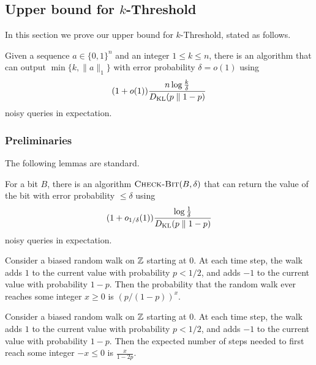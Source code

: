 \subsection{Upper bound for \texorpdfstring{$k$}{k}-Threshold}
In this section we prove our upper bound for $k$-Threshold, stated as follows.

\begin{theorem}
\label{thm:threshold-upper}
  Given a sequence $a \in \{0, 1\}^n$ and an integer $1 \le k \le n$, there is an algorithm that can output $\min\{k, \lVert a \rVert_1\}$ with error probability $\delta = o(1)$ using
  \[
  (1+o(1))\frac{n \log \frac{k}{\delta}}{D_{\operatorname{\mathrm{KL}}}(p \parallel 1-p)}
  \]
  noisy queries in expectation.
\end{theorem}

\subsubsection{Preliminaries}
The following lemmas are standard.

\begin{lemma}
\label{lem:check-bit}
    For a bit $B$, there is an algorithm $\textup{\textsc{Check-Bit}}(B, \delta)$ that can return the value of the bit with error probability $\le \delta$ using
    \[
    (1+o_{1/\delta}(1)) \frac{\log \frac{1}{\delta}}{D_{\operatorname{\mathrm{KL}}}(p \parallel 1-p)}
    \]
    noisy queries in expectation.
\end{lemma}

\begin{lemma}
\label{lem:monkey-at-cliff}
Consider a biased random walk on $\mathbb{Z}$ starting at $0$. At each time step, the walk adds $1$ to the current value with probability $p < 1/2$, and adds $-1$ to the current value with probability $1-p$. Then the probability that the random walk ever reaches some integer $x \ge 0$ is $(p/(1-p))^x$.
\end{lemma}

\begin{lemma}
\label{lem:expected-hitting-time}
Consider a biased random walk on $\mathbb{Z}$ starting at $0$. At each time step, the walk adds $1$ to the current value with probability $p < 1/2$, and adds $-1$ to the current value with probability $1-p$. Then the expected number of steps needed to first reach some integer $-x \le 0$ is $\frac{x}{1-2p}$.
\end{lemma}

